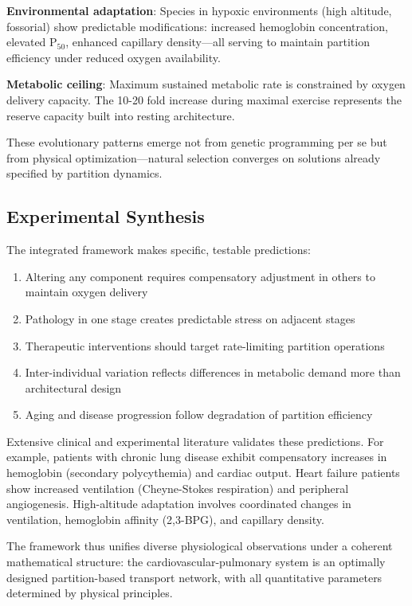 \textbf{Environmental adaptation}: Species in hypoxic environments (high altitude, fossorial) show predictable modifications: increased hemoglobin concentration, elevated P$_{50}$, enhanced capillary density—all serving to maintain partition efficiency under reduced oxygen availability.

\textbf{Metabolic ceiling}: Maximum sustained metabolic rate is constrained by oxygen delivery capacity. The 10-20 fold increase during maximal exercise represents the reserve capacity built into resting architecture.

These evolutionary patterns emerge not from genetic programming per se but from physical optimization—natural selection converges on solutions already specified by partition dynamics.

\subsection{Experimental Synthesis}

The integrated framework makes specific, testable predictions:

\begin{enumerate}
\item Altering any component requires compensatory adjustment in others to maintain oxygen delivery
\item Pathology in one stage creates predictable stress on adjacent stages
\item Therapeutic interventions should target rate-limiting partition operations
\item Inter-individual variation reflects differences in metabolic demand more than architectural design
\item Aging and disease progression follow degradation of partition efficiency
\end{enumerate}

Extensive clinical and experimental literature validates these predictions. For example, patients with chronic lung disease exhibit compensatory increases in hemoglobin (secondary polycythemia) and cardiac output. Heart failure patients show increased ventilation (Cheyne-Stokes respiration) and peripheral angiogenesis. High-altitude adaptation involves coordinated changes in ventilation, hemoglobin affinity (2,3-BPG), and capillary density.

The framework thus unifies diverse physiological observations under a coherent mathematical structure: the cardiovascular-pulmonary system is an optimally designed partition-based transport network, with all quantitative parameters determined by physical principles.


